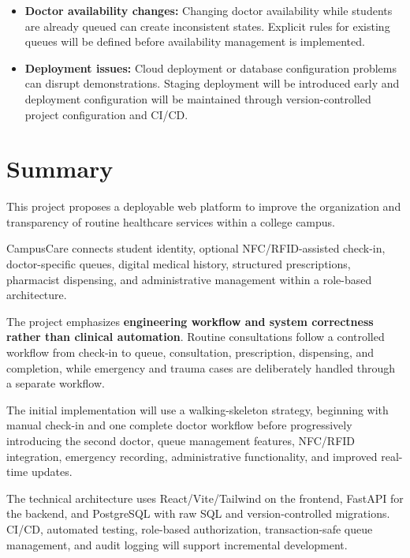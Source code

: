 \documentclass[11pt,a4paper]{article}
\begin{document}
\begin{itemize}
    \item \textbf{Doctor availability changes:} Changing doctor availability while students are already queued can create inconsistent states. Explicit rules for existing queues will be defined before availability management is implemented.

    \item \textbf{Deployment issues:} Cloud deployment or database configuration problems can disrupt demonstrations. Staging deployment will be introduced early and deployment configuration will be maintained through version-controlled project configuration and CI/CD.

\end{itemize}


\section{Summary}

This project proposes a deployable web platform to improve the organization and transparency of routine healthcare services within a college campus.

CampusCare connects student identity, optional NFC/RFID-assisted check-in, doctor-specific queues, digital medical history, structured prescriptions, pharmacist dispensing, and administrative management within a role-based architecture.

The project emphasizes \textbf{engineering workflow and system correctness rather than clinical automation}. Routine consultations follow a controlled workflow from check-in to queue, consultation, prescription, dispensing, and completion, while emergency and trauma cases are deliberately handled through a separate workflow.

The initial implementation will use a walking-skeleton strategy, beginning with manual check-in and one complete doctor workflow before progressively introducing the second doctor, queue management features, NFC/RFID integration, emergency recording, administrative functionality, and improved real-time updates.

The technical architecture uses React/Vite/Tailwind on the frontend, FastAPI for the backend, and PostgreSQL with raw SQL and version-controlled migrations. CI/CD, automated testing, role-based authorization, transaction-safe queue management, and audit logging will support incremental development.
\end{document}
